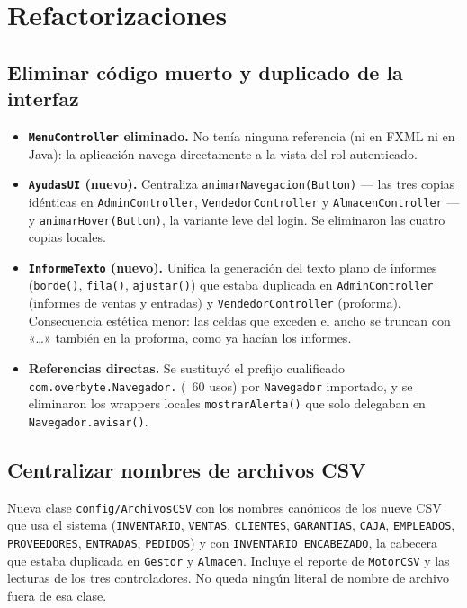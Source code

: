 \chapter{Refactorizaciones}

\section{Eliminar código muerto y duplicado de la interfaz}
\begin{itemize}
\item \textbf{\texttt{MenuController} eliminado.} No tenía ninguna referencia (ni en FXML ni en Java): la aplicación navega directamente a la vista del rol autenticado.
\item \textbf{\texttt{AyudasUI} (nuevo).} Centraliza \texttt{animarNavegacion(Button)} — las tres copias idénticas en \texttt{AdminController}, \texttt{VendedorController} y \texttt{AlmacenController} — y \texttt{animarHover(Button)}, la variante leve del login. Se eliminaron las cuatro copias locales.
\item \textbf{\texttt{InformeTexto} (nuevo).} Unifica la generación del texto plano de informes (\texttt{borde()}, \texttt{fila()}, \texttt{ajustar()}) que estaba duplicada en \texttt{AdminController} (informes de ventas y entradas) y \texttt{VendedorController} (proforma). Consecuencia estética menor: las celdas que exceden el ancho se truncan con «…» también en la proforma, como ya hacían los informes.
\item \textbf{Referencias directas.} Se sustituyó el prefijo cualificado \texttt{com.overbyte.Navegador.} (~60 usos) por \texttt{Navegador} importado, y se eliminaron los wrappers locales \texttt{mostrarAlerta()} que solo delegaban en \texttt{Navegador.avisar()}.
\end{itemize}

\section{Centralizar nombres de archivos CSV}
Nueva clase \texttt{config/ArchivosCSV} con los nombres canónicos de los nueve CSV que usa el sistema (\texttt{INVENTARIO}, \texttt{VENTAS}, \texttt{CLIENTES}, \texttt{GARANTIAS}, \texttt{CAJA}, \texttt{EMPLEADOS}, \texttt{PROVEEDORES}, \texttt{ENTRADAS}, \texttt{PEDIDOS}) y con \texttt{INVENTARIO\_ENCABEZADO}, la cabecera que estaba duplicada en \texttt{Gestor} y \texttt{Almacen}. Incluye el reporte de \texttt{MotorCSV} y las lecturas de los tres controladores. No queda ningún literal de nombre de archivo fuera de esa clase.

